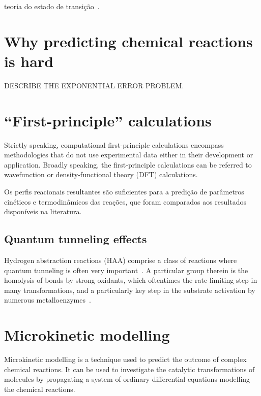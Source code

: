teoria do estado de transição~\cite{TransitionStateTheory}. %



\section{Why predicting chemical reactions is hard}

DESCRIBE THE EXPONENTIAL ERROR PROBLEM.\@



\section{``First-principle'' calculations}

Strictly speaking, computational first-principle calculations encompass
methodologies that do not use experimental data either in their development or
application.
Broadly speaking, the first-principle calculations can be referred to
wavefunction or density-functional theory (DFT) calculations.




Os perfis reacionais resultantes são suficientes para a predição de parâmetros
cinéticos e termodinâmicos das reações, que foram comparados aos resultados
disponíveis na literatura. %


\subsection{Quantum tunneling effects}

Hydrogen abstraction reactions (HAA) comprise a class of reactions where
quantum tunneling is often very important~\cite{Bim2018}.
A particular group therein is the homolysis of  bonds by strong
oxidants, which oftentimes the rate-limiting step in many transformations, and
a particularly key step in the substrate activation by numerous
metalloenzymes~\cite{Bim2018}.


\section{Microkinetic modelling}

Microkinetic modelling is a technique used to predict the outcome of complex
chemical reactions.
It can be used to investigate the catalytic transformations of molecules by
propagating a system of ordinary differential equations modelling the chemical
reactions.

